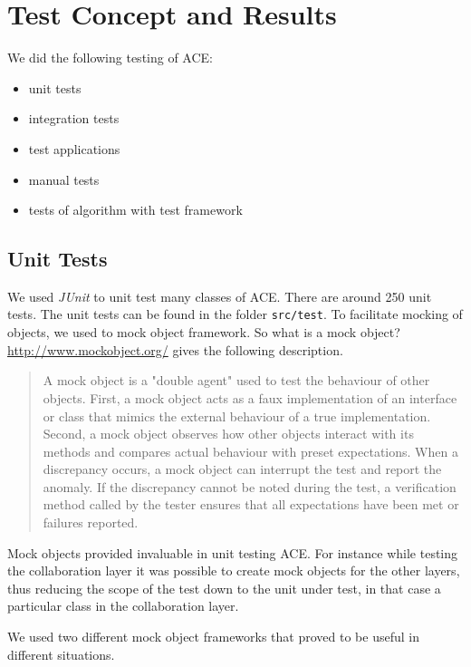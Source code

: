 \chapter{Test Concept and Results}
\label{chapter:testing}

We did the following testing of ACE:

\begin{itemize}
 \item unit tests
 \item integration tests
 \item test applications
 \item manual tests
 \item tests of algorithm with test framework
\end{itemize}



\section{Unit Tests}
We used \emph{JUnit} to unit test many classes of ACE. There are around
250 unit tests. The unit tests can be found in the folder \texttt{src/test}.
To facilitate mocking of objects, we used to mock object framework. So
what is a mock object? 
\href{http://www.mockobject.org/}{http://www.mockobject.org/} gives the
following description.

\begin{quote}
A mock object is a "double agent" used to test the behaviour of other objects. 
First, a mock object acts as a faux implementation of an interface or class that 
mimics the external behaviour of a true implementation. Second, a mock object 
observes how other objects interact with its methods and compares actual 
behaviour with preset expectations. When a discrepancy occurs, a mock object can 
interrupt the test and report the anomaly. If the discrepancy cannot be noted 
during the test, a verification method called by the tester ensures that all 
expectations have been met or failures reported.
\end{quote}

Mock objects provided invaluable in unit testing ACE. For instance while
testing the collaboration layer it was possible to create mock objects for
the other layers, thus reducing the scope of the test down to the unit
under test, in that case a particular class in the collaboration layer.

We used two different mock object frameworks that proved to be useful in
different situations.

